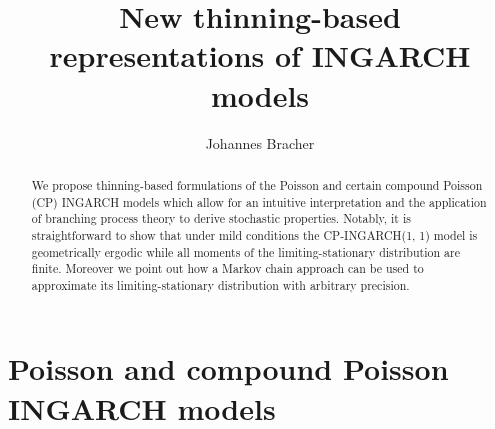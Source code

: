 \documentclass{article}
\begin{document}
\title{New thinning-based representations of INGARCH models}
\author{Johannes Bracher}


\newcommand{\juv}{S}

\maketitle


\begin{abstract}
We propose thinning-based formulations of the Poisson and certain compound Poisson (CP) INGARCH models which allow for an intuitive interpretation and the application of branching process theory to derive stochastic properties. Notably, it is straightforward to show that under mild conditions the CP-INGARCH(1, 1) model is geometrically ergodic while all moments of the limiting-stationary distribution are finite. Moreover we point out how a Markov chain approach can be used to approximate its limiting-stationary distribution with arbitrary precision.
\end{abstract}





\section{Poisson and compound Poisson INGARCH models}
\label{sec:original_formulation}
\end{document}
